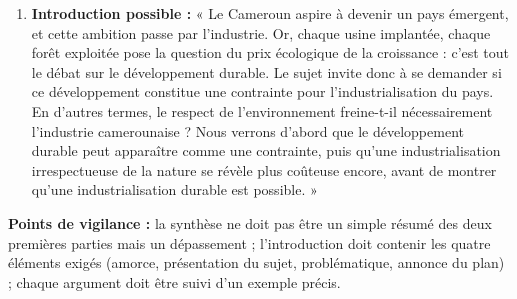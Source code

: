 \documentclass[11pt]{article}
\begin{document}
\begin{corrige}
\begin{enumerate}
\begin{itemize}
\item \textbf{III. Synthèse : vers une industrialisation durable.} Arg. 1 : l'écologie peut créer des emplois nouveaux (ex. : recyclage, énergies solaires). Arg. 2 : transformer localement en respectant les normes valorise les produits camerounais (ex. : certification du bois pour l'exportation).
\end{itemize}
\item \textbf{Introduction possible :} « Le Cameroun aspire à devenir un pays émergent, et cette ambition passe par l'industrie. Or, chaque usine implantée, chaque forêt exploitée pose la question du prix écologique de la croissance : c'est tout le débat sur le développement durable. Le sujet invite donc à se demander si ce développement constitue une contrainte pour l'industrialisation du pays. En d'autres termes, le respect de l'environnement freine-t-il nécessairement l'industrie camerounaise ? Nous verrons d'abord que le développement durable peut apparaître comme une contrainte, puis qu'une industrialisation irrespectueuse de la nature se révèle plus coûteuse encore, avant de montrer qu'une industrialisation durable est possible. »
\end{enumerate}
\textbf{Points de vigilance :} la synthèse ne doit pas être un simple résumé des deux premières parties mais un dépassement ; l'introduction doit contenir les quatre éléments exigés (amorce, présentation du sujet, problématique, annonce du plan) ; chaque argument doit être suivi d'un exemple précis.
\end{corrige}
\end{document}
